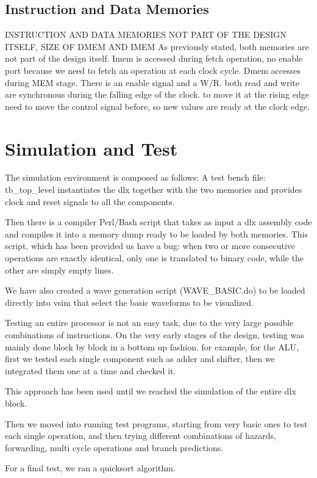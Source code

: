 \documentclass[12pt]{article}
\begin{document}
\subsection{Instruction and Data Memories}
INSTRUCTION AND DATA MEMORIES NOT PART OF THE DESIGN ITSELF, SIZE OF DMEM AND IMEM
As previously stated, both memories are not part of the design itself.
Imem is accessed during fetch operation, no enable port because we need to fetch an operation at each clock cycle.
Dmem accesses during MEM stage. There is an enable signal and a W/R. both read and write are synchronous during the falling edge of the clock. to move it at the rising edge need to move the control signal before, so new values are ready at the clock edge.


\section{Simulation and Test}\label{Simulation}
The simulation environment is composed as follows:
A test bench file: tb\_top\_level instantiates the dlx together with the two memories and provides clock and reset signals to all the components.

Then there is a compiler Perl/Bash script that takes as input a dlx assembly code and compiles it into a memory dump ready to be loaded by both memories.
This script, which has been provided us have a bug: when two or more consecutive operations are exactly identical, only one is translated to binary code, while the other are simply empty lines.

We have also created a wave generation script (WAVE\_BASIC.do) to be loaded directly into vsim that select the basic waveforms to be visualized.

Testing an entire processor is not an easy task, due to the very large possible combinations of instructions.
On the very early stages of the design, testing was mainly done block by block in a bottom up fashion. for example, for the ALU, first we tested each single component such as adder and shifter, then we integrated them one at a time and checked it.

This approach has been used until we reached the simulation of the entire dlx block.


Then we moved into running test programs, starting from very basic ones to test each single operation, and then trying different combinations of hazards, forwarding, multi cycle operations and branch predictions.

For a final test, we ran a quicksort algorithm.
\end{document}
